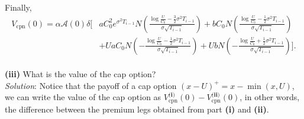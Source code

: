 \documentclass[paper=a4, fontsize=11pt]{scrartcl} %
\numberwithin{equation}{section} %
\numberwithin{figure}{section} %
\numberwithin{table}{section} %
\begin{document}
Finally,
\begin{align*}
V_{\text{cpn}}(0) = \alpha \mathcal{A}(0)\delta \Bigg[
&a C_0^2 e^{\sigma^2 T_{i-1}} N\left(\frac{\log\frac{U}{C_0}-  \frac{3}{2}\sigma^2 T_{i-1}}{\sigma\sqrt{T_{i-1}}} \right)
+ b C_0 N\left(\frac{\log\frac{U}{C_0}-  \frac{1}{2}\sigma^2 T_{i-1}}{\sigma\sqrt{T_{i-1}}} \right)\\
&+  Ua C_0N\left(-\frac{\log\frac{U}{C_0}-  \frac{1}{2}\sigma^2 T_{i-1}}{\sigma\sqrt{T_{i-1}}} \right) + Ub N\left(-\frac{\log\frac{U}{C_0}+  \frac{1}{2}\sigma^2 T_{i-1}}{\sigma\sqrt{T_{i-1}}} \right)\Bigg].
\end{align*}\\

\textbf{(iii)} What is the value of the cap option?\\
\textit{Solution}: Notice that the payoff of a cap option $(x-U)^+ = x-\min(x,U)$, we can write the value of the cap option as
$
V^{\textbf{(i)}}_{\text{cpn}}(0)-V^{\textbf{(ii)}}_{\text{cpn}}(0)
$, in other words, the difference between the premium legs obtained from part \textbf{(i)} and \textbf{(ii)}.

\newpage
\end{document}
